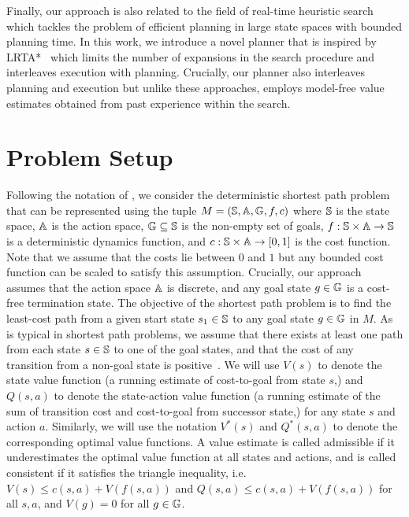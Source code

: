 Finally, our approach is also related to the field of real-time
heuristic search which tackles the problem of efficient planning in
large state spaces with bounded planning time. In this work, we
introduce a novel planner that is inspired by
LRTA*~\cite{DBLP:journals/ai/Korf90} which limits the number of
expansions in the search procedure and interleaves execution with
planning. Crucially, our planner also interleaves planning and
execution but unlike these approaches, employs model-free value
estimates obtained from past experience within the search.






\section{Problem Setup}
\label{sec:problem-setup}

Following the notation of \cite{cmax}, we consider the
deterministic shortest path problem that can be represented using  the
tuple $M = (\mathbb{S}, \mathbb{A}, \mathbb{G}, f, c)$ where
$\mathbb{S}$ is the state space, $\mathbb{A}$ is the action space,
$\mathbb{G} \subseteq \mathbb{S}$ is the non-empty set of goals,
$f:\mathbb{S} \times \mathbb{A} \rightarrow \mathbb{S}$ is a
deterministic dynamics function, and $c:\mathbb{S} \times
\mathbb{A} \rightarrow [0, 1]$ is the cost function. Note that we
assume that the costs lie between $0$ and $1$ but any bounded cost
function can be scaled to satisfy this assumption. Crucially, our
approach assumes that the action space $\mathbb{A}$ is discrete, and any
goal state $g \in \mathbb{G}$ is a cost-free termination state. The
objective of the shortest path problem is to find the least-cost path
from a given start state $s_1 \in \mathbb{S}$ to any goal state $g
\in \mathbb{G}$ in $M$. As is typical in shortest path problems, we
assume that there exists at least one path from each state $s \in
\mathbb{S}$ to one of the goal states, and that the cost of any
transition from a non-goal state is
positive~\cite{DBLP:books/lib/Bertsekas05}. We will use $V(s)$ to
denote the state value function (a running estimate of cost-to-goal
from state $s$,) and $Q(s, a)$ to denote the
state-action value function (a running estimate of the sum of
transition cost and cost-to-goal from successor state,) for any state $s$ and action
$a$. Similarly, we will use the notation $V^*(s)$ and $Q^*(s, a)$ to
denote the corresponding optimal value functions. A value estimate is
called admissible if it underestimates the optimal value function at
all states and actions, and is called consistent if it satisfies the
triangle inequality, i.e. $V(s) \leq c(s, a) + V(f(s, a))$ and $Q(s,
a) \leq c(s, a) + V(f(s, a))$ for all $s, a$, and $V(g) = 0$ for all $g \in \mathbb{G}$.



